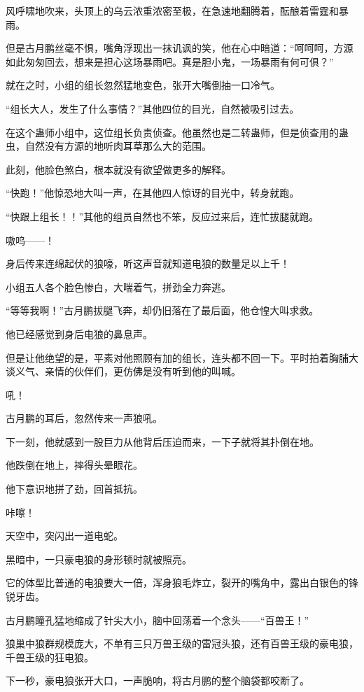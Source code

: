 \begin{this_body}
风呼啸地吹来，头顶上的乌云浓重浓密至极，在急速地翻腾着，酝酿着雷霆和暴雨。

但是古月鹏丝毫不惧，嘴角浮现出一抹讥讽的笑，他在心中暗道：“呵呵呵，方源如此匆匆回去，想来是担心这场暴雨吧。真是胆小鬼，一场暴雨有何可俱？”

就在之时，小组的组长忽然猛地变色，张开大嘴倒抽一口冷气。

“组长大人，发生了什么事情？”其他四位的目光，自然被吸引过去。

在这个蛊师小组中，这位组长负责侦查。他虽然也是二转蛊师，但是侦查用的蛊虫，自然没有方源的地听肉耳草那么大的范围。

此刻，他脸色煞白，根本就没有欲望做更多的解释。

“快跑！”他惊恐地大叫一声，在其他四人惊讶的目光中，转身就跑。

“快跟上组长！！”其他的组员自然也不笨，反应过来后，连忙拔腿就跑。

嗷呜——！

身后传来连绵起伏的狼嚎，听这声音就知道电狼的数量足以上千！

小组五人各个脸色惨白，大喘着气，拼劲全力奔逃。

“等等我啊！”古月鹏拔腿飞奔，却仍旧落在了最后面，他仓惶大叫求救。

他已经感觉到身后电狼的鼻息声。

但是让他绝望的是，平素对他照顾有加的组长，连头都不回一下。平时拍着胸脯大谈义气、亲情的伙伴们，更仿佛是没有听到他的叫喊。

吼！

古月鹏的耳后，忽然传来一声狼吼。

下一刻，他就感到一股巨力从他背后压迫而来，一下子就将其扑倒在地。

他跌倒在地上，摔得头晕眼花。

他下意识地拼了劲，回首抵抗。

咔嚓！

天空中，突闪出一道电蛇。

黑暗中，一只豪电狼的身形顿时就被照亮。

它的体型比普通的电狼要大一倍，浑身狼毛炸立，裂开的嘴角中，露出白银色的锋锐牙齿。

古月鹏瞳孔猛地缩成了针尖大小，脑中回荡着一个念头——“百兽王！”

狼巢中狼群规模庞大，不单有三只万兽王级的雷冠头狼，还有百兽王级的豪电狼，千兽王级的狂电狼。

下一秒，豪电狼张开大口，一声脆响，将古月鹏的整个脑袋都咬断了。


\end{this_body}
